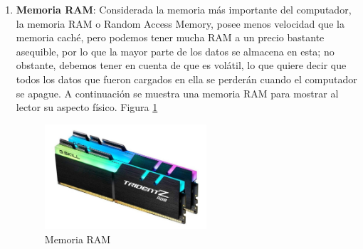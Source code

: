 \documentclass{article}
\begin{document}
\begin{enumerate}
\item \textbf{Memoria RAM}: Considerada la memoria más importante del computador, la memoria RAM o Random Access Memory, posee menos velocidad que la memoria caché, pero podemos tener mucha RAM a un precio bastante asequible, por lo que la mayor parte de los datos se almacena en esta; no obstante, debemos tener en cuenta de que es volátil, lo que quiere decir que todos los datos que fueron cargados en ella se perderán cuando el computador se apague. A continuación se muestra una memoria RAM para mostrar al lector su aspecto físico. Figura \ref{fig:memoriaram}
    \begin{figure}[h]
        \centering
        \includegraphics[width=6cm]{Memoria RAM.jpg}
        \caption{Memoria RAM}
        \label{fig:memoriaram}
    \end{figure}
    

\end{enumerate}
\end{document}
